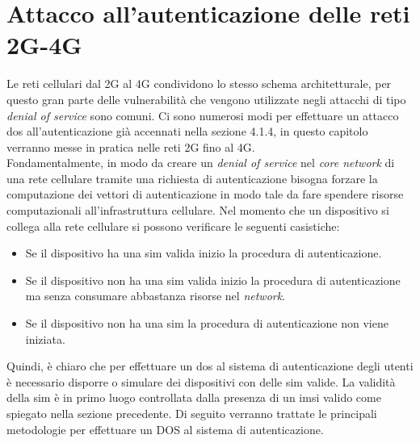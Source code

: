 \chapter{Attacco all'autenticazione delle reti 2G-4G}
Le reti cellulari dal 2G al 4G condividono lo stesso schema architetturale, per questo gran parte delle vulnerabilità che vengono
utilizzate negli attacchi di tipo \textit{denial of service} sono comuni.
Ci sono numerosi modi per effettuare un attacco \gls{dos} all'autenticazione già accennati nella sezione 4.1.4, in questo capitolo verranno messe in pratica 
nelle reti 2G fino al 4G.\\
Fondamentalmente, in modo da creare un \textit{denial of service} nel \textit{core network} di una rete cellulare tramite una richiesta di autenticazione bisogna forzare
la computazione dei vettori di autenticazione in modo tale da fare spendere risorse computazionali all'infrastruttura cellulare.
Nel momento che un dispositivo si collega alla rete cellulare si possono verificare le seguenti casistiche:
\begin{itemize}
    \item Se il dispositivo ha una \gls{sim} valida inizio la procedura di autenticazione.
    \item Se il dispositivo non ha una \gls{sim} valida inizio la procedura di autenticazione ma senza consumare abbastanza risorse nel \textit{network}.
    \item Se il dispositivo non ha una \gls{sim} la procedura di autenticazione non viene iniziata.
\end{itemize}
Quindi, è chiaro che per effettuare un \gls{dos} al sistema di autenticazione degli utenti è necessario disporre o simulare dei dispositivi con delle \gls{sim} valide. La validità della \gls{sim} è 
in primo luogo controllata dalla presenza di un \gls{imsi} valido come spiegato nella sezione precedente.
Di seguito verranno trattate le principali metodologie per effettuare un DOS al sistema di autenticazione.

\clearpage

